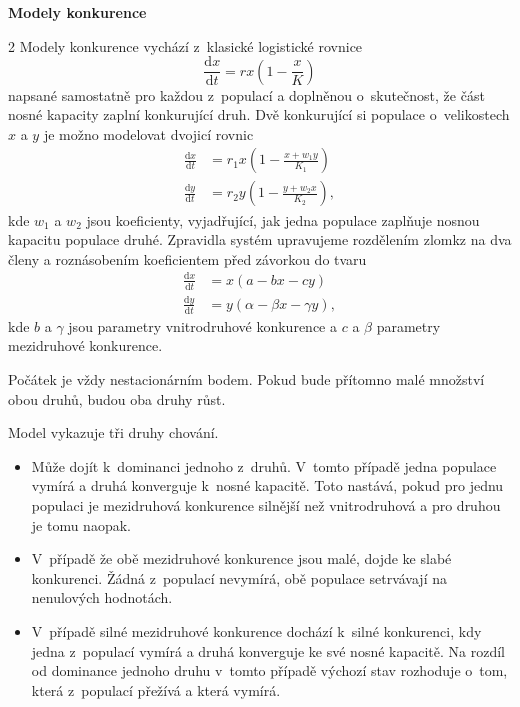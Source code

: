 \documentclass{article}
\begin{document}
\begin{center}
  \Large \bfseries
Modely konkurence
\end{center}
\pagestyle{empty}

\begin{multicols}2
Modely konkurence vychází z klasické logistické rovnice
$$    \frac{\mathrm dx}{\mathrm dt} = rx\left(1-\frac{x}{K}\right) $$
napsané samostatně pro každou z populací a doplněnou o skutečnost, že část nosné kapacity zaplní konkurující druh. 
Dvě konkurující si populace o velikostech $x$ a $y$ je možno modelovat dvojicí
rovnic
\begin{equation*}
  \begin{aligned}
    \frac{\mathrm dx}{\mathrm dt} &= r_1x\left(1-\frac{x+w_1y}{K_1}\right) \\
    \frac{\mathrm dy}{\mathrm dt} &= r_2y\left(1-\frac{y+w_2x}{K_2}\right), 
  \end{aligned}
\end{equation*}
kde $w_1$ a $w_2$ jsou koeficienty, vyjadřující, jak jedna populace zaplňuje nosnou kapacitu populace druhé. 
Zpravidla systém upravujeme rozdělením zlomkz na dva členy a roznásobením koeficientem před závorkou do tvaru
\begin{equation*}
  \begin{aligned}
    \frac{\mathrm dx}{\mathrm dt} &= x(a-bx-cy) \\
    \frac{\mathrm dy}{\mathrm dt} &= y(\alpha-\beta x - \gamma y), 
  \end{aligned}
\end{equation*}
kde $b$ a $\gamma$ jsou parametry vnitrodruhové konkurence a $c$ a $\beta$ parametry mezidruhové konkurence.

Počátek je vždy nestacionárním bodem. Pokud bude přítomno malé
množství obou druhů, budou oba druhy růst.

Model vykazuje tři druhy chování.
\begin{itemize} pt
\item Může dojít k dominanci jednoho z druhů. V tomto případě jedna
  populace vymírá a druhá konverguje k nosné kapacitě. Toto nastává,
  pokud pro jednu populaci je mezidruhová konkurence silnější než
  vnitrodruhová a pro druhou je tomu naopak.
\item V případě že obě mezidruhové konkurence jsou malé, dojde ke
  slabé konkurenci. Žádná z populací nevymírá, obě populace setrvávají
  na nenulových hodnotách.
\item V případě silné mezidruhové konkurence dochází k silné
  konkurenci, kdy jedna z populací vymírá a druhá konverguje ke své
  nosné kapacitě. Na rozdíl od dominance jednoho druhu v tomto případě
  výchozí stav rozhoduje o tom, která z populací přežívá a která
  vymírá.
\end{itemize}


\end{multicols}
\end{document}
